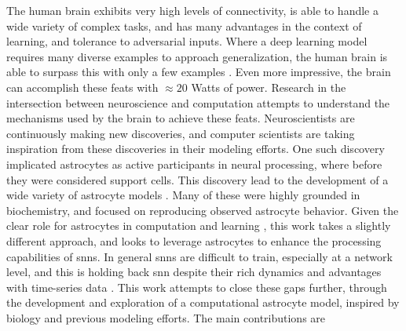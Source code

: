 \documentclass[conference]{IEEEtran}
\begin{document}


The human brain exhibits very high levels of connectivity, is able to handle a
wide variety of complex tasks, and has many advantages in the context of
learning, and tolerance to adversarial inputs. Where a deep learning model
requires many diverse examples to approach generalization, the human brain is
able to surpass this with only a few examples \parencite{tsimenidis_2020}. Even
more impressive, the brain can accomplish these feats with $\approx 20$ Watts of
power. Research in the intersection between neuroscience and computation
attempts to understand the mechanisms used by the brain to achieve these
feats. Neuroscientists are continuously making new discoveries, and computer
scientists are taking inspiration from these discoveries in their modeling
efforts. One such discovery implicated astrocytes as active participants in
neural processing, where before they were considered support cells. This
discovery lead to the development of a wide variety of astrocyte models
\cite{manninen_2019}. Many of these were highly grounded in biochemistry, and
focused on reproducing observed astrocyte behavior. Given the clear role for
astrocytes in computation and learning \parencite{mederos_2018}, this work takes
a slightly different approach, and looks to leverage astrocytes to enhance the
processing capabilities of \glspl{snn}. In general \glspl{snn} are difficult to
train, especially at a network level, and this is holding back \gls{snn} despite
their rich dynamics and advantages with time-series data
\parencite{tavanaei_2019}. This work attempts to close these gaps further,
through the development and exploration of a computational astrocyte model,
inspired by biology and previous modeling efforts. The main contributions are
\end{document}
